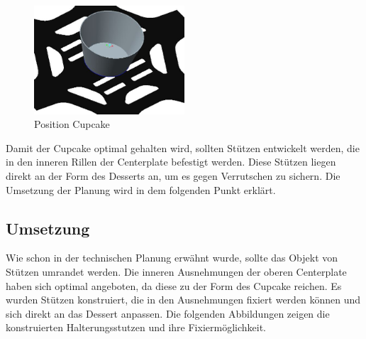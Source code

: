 			\begin{figure}[tbh]
			\begin{centering}
			\includegraphics[width = 0.5\textwidth]{Bilder/platte_cupcake}
			\par\end{centering}
			\caption{Position Cupcake}
			\label{platte_cupcake}
			\end{figure}

		Damit der Cupcake optimal gehalten wird, sollten Stützen entwickelt werden, die in den inneren Rillen der Centerplate befestigt werden.
		Diese Stützen liegen direkt an der Form des Desserts an, um es gegen Verrutschen zu sichern. Die Umsetzung der Planung wird in dem folgenden Punkt erklärt.

			\newpage

	\subsection{Umsetzung}

	Wie schon in der technischen Planung erwähnt wurde, sollte das Objekt von Stützen umrandet werden. Die inneren Ausnehmungen der oberen Centerplate haben sich optimal angeboten, da diese zu der Form des Cupcake reichen.
	Es wurden Stützen konstruiert, die in den Ausnehmungen fixiert werden können und sich direkt an das Dessert anpassen. Die folgenden Abbildungen zeigen die konstruierten Halterungsstutzen und ihre Fixiermöglichkeit.


